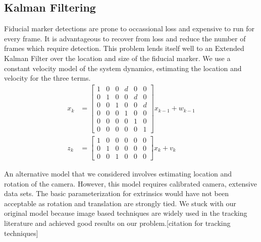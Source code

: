 \documentclass[letterpaper,10pt,conference]{IEEEtran}
\begin{document}
\subsection{Kalman Filtering}
Fiducial marker detections are prone to occassional loss and expensive to run for every frame.  It is advantageous to recover from loss and reduce the number of frames which require detection.  This problem lends itself well to an Extended Kalman Filter over the location and size of the fiducial marker.  We use a constant velocity model of the system dynamics, estimating the location and velocity for the three terms.  
\begin{align}
x_k &= \left[ \begin{array}{cccccc} 
1 & 0 & 0 & d & 0 & 0 \\
0 & 1 & 0 & 0 & d & 0 \\
0 & 0 & 1 & 0 & 0 & d \\
0 & 0 & 0 & 1 & 0 & 0\\
0 & 0 & 0 & 0 & 1 & 0\\
0 & 0 & 0 & 0 & 0 & 1
\end{array}\right] x_{k-1} + w_{k-1}\\
z_k &= \left[ \begin{array}{cccccc}
1 & 0 & 0 & 0 & 0 & 0\\
0 & 1 & 0 & 0 & 0 & 0\\
0 & 0 & 1 & 0 & 0 & 0\end{array}\right] x_k + v_{k}
\end{align}

An alternative model that we considered involves estimating location and rotation of the camera.  However, this model requires calibrated camera, extensive data sets.  The basic parameterization for extrinsics would have not been acceptable as rotation and translation are strongly tied.  We stuck with our original model because image based techniques are widely used in the tracking literature and achieved good results on our problem.[citation for tracking techniques]
\end{document}
